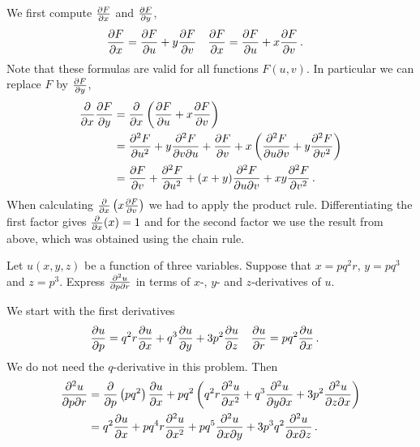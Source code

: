 \begin{solution}
We first compute $\frac{\partial F}{\partial x}$ and $\frac{\partial F}{\partial y}$,
\begin{align*}
\frac{\partial F}{\partial x} &= \frac{\partial F}{\partial u} + y\frac{\partial F}{\partial v} &
\frac{\partial F}{\partial x} &= \frac{\partial F}{\partial u} + x\frac{\partial F}{\partial v}\,.
\end{align*}
Note that these formulas are valid for all functions $F(u,v)$. In particular we can replace $F$ by $\frac{\partial F}{\partial y}$,
\begin{align*}
\frac{\partial}{\partial x}\frac{\partial F}{\partial y} &=
\frac{\partial}{\partial x}\left(\frac{\partial F}{\partial u} + x\frac{\partial F}{\partial v}\right) \\
&= \frac{\partial^2 F}{\partial u^2} + y\frac{\partial^2 F}{\partial v \partial u}
+ \frac{\partial F}{\partial v}
+ x \left( \frac{\partial^2 F}{\partial u \partial v} + y\frac{\partial^2 F}{\partial v^2} \right) \\
&= \frac{\partial F}{\partial v} + \frac{\partial^2 F}{\partial u^2} 
+ (x + y) \frac{\partial^2 F}{\partial u \partial v} + x y\frac{\partial^2 F}{\partial v^2}\,.
\end{align*}
When calculating $\frac{\partial}{\partial x} \left( x \frac{\partial F}{\partial v} \right)$ we had to apply the product rule. Differentiating the first factor gives $\frac{\partial}{\partial x}(x) = 1$ and for the second factor we use the result from above, which was obtained using the chain rule.
\end{solution}

\begin{question}
Let $u(x, y, z)$ be a function of three variables. Suppose that $x = pq^2 r$, $y = pq^3$ and $z = p^3$. Express $\frac{\partial^2 u}{\partial p \partial r}$ in terms of $x$-, $y$- and $z$-derivatives of $u$.
\end{question}

\begin{solution}
We start with the first derivatives
\begin{align*}
\frac{\partial u}{\partial p} &= q^2 r \frac{\partial u}{\partial x} + q^3 \frac{\partial u}{\partial y}
+ 3p^2 \frac{\partial u}{\partial z} &
\frac{\partial u}{\partial r} &= pq^2 \frac{\partial u}{\partial x}\,.
\end{align*}
We do not need the $q$-derivative in this problem. Then
\begin{align*}
\frac{\partial^2 u}{\partial p \partial r} &= \frac{\partial}{\partial p} \left(pq^2\right) \frac{\partial u}{\partial x} 
+ pq^2\left( q^2 r \frac{\partial^2 u}{\partial x^2} + q^3 \frac{\partial^2 u}{\partial y \partial x}
+ 3p^2 \frac{\partial^2 u}{\partial z \partial x} \right) \\
&= q^2 \frac{\partial u}{\partial x} 
+ pq^4 r \frac{\partial^2 u}{\partial x^2} + pq^5 \frac{\partial^2 u}{\partial x \partial y}
+ 3p^3q^2 \frac{\partial^2 u}{\partial x \partial z}\,.
\end{align*}
\end{solution}

